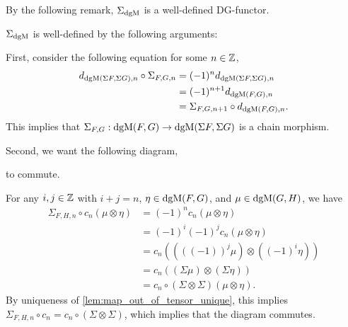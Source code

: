 By the following remark, \( \Sigma_{\operatorname{dgM}} \) is a well-defined DG-functor.

\begin{remark}
    \( \Sigma_{\operatorname{dgM}} \) is well-defined by the following arguments:

    First, consider the following equation for some \( n \in {\mathbb{Z}} \),
    \begin{align*}
        d_{\operatorname{dgM}(\Sigma F, \Sigma G), n} \circ \Sigma_{F, G, n} &= (-1)^n d_{\operatorname{dgM}(\Sigma F, \Sigma G), n} \\
        &= (-1)^{n + 1} d_{\operatorname{dgM}(F, G), n} \\
        &= \Sigma_{F, G, n + 1} \circ d_{\operatorname{dgM}(F, G), n}.
    \end{align*}
    This implies that \( \Sigma_{F, G}: \operatorname{dgM}(F, G) \to \operatorname{dgM}(\Sigma F, \Sigma G) \) is a chain morphism.

    Second, we want the following diagram,
    \begin{center}
    \end{center}
    to commute.
    
    For any \( i, j \in {\mathbb{Z}} \) with \( i + j = n \), \( \eta \in \operatorname{dgM}(F, G) \), and \( \mu \in \operatorname{dgM}(G, H) \), we have
    \begin{align*}
        \Sigma_{F, H, n} \circ c_n (\mu \otimes \eta) &= (-1)^n c_n (\mu \otimes \eta) \\
        &= (-1)^i (-1)^j c_n (\mu \otimes \eta) \\
        &= c_n ((((-1))^j \mu) \otimes ((-1)^i \eta)) \\
        &= c_n ((\Sigma \mu) \otimes (\Sigma \eta)) \\
        &= c_n \circ (\Sigma \otimes \Sigma) (\mu \otimes \eta).
    \end{align*}
    By uniqueness of \autoref{lem:map_out_of_tensor_unique}, this implies \( \Sigma_{F, H, n} \circ c_n = c_n \circ (\Sigma \otimes \Sigma) \), which implies that the diagram commutes.


\end{remark}
